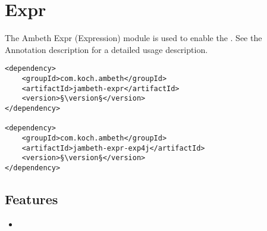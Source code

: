 \section{Expr}
\label{module:Expr}
\ClearAPI
The Ambeth Expr (Expression) module is used to enable the .  See the Annotation description for a detailed usage description.
\begin{lstlisting}[style=POM,caption={Maven modules to use \emph{Ambeth Expr}}]
<dependency>
	<groupId>com.koch.ambeth</groupId>
	<artifactId>jambeth-expr</artifactId>
	<version>§\version§</version>
</dependency>

<dependency>
	<groupId>com.koch.ambeth</groupId>
	<artifactId>jambeth-expr-exp4j</artifactId>
	<version>§\version§</version>
</dependency>
\end{lstlisting}
\subsection{Features}
\begin{itemize}
	\item \TODO
\end{itemize}

